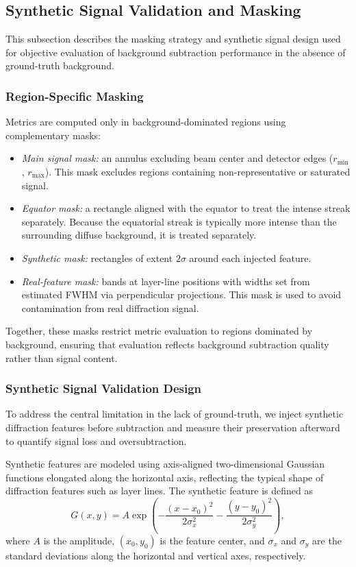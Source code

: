 \documentclass[iucr]{iucrjournals}
\begin{document}
\subsection{Synthetic Signal Validation and Masking}

This subsection describes the masking strategy and synthetic signal design used for objective evaluation of background subtraction performance in the absence of ground-truth background.

\subsubsection{Region-Specific Masking}

Metrics are computed only in background-dominated regions using complementary masks:
\begin{itemize}
\item \textit{Main signal mask:} an annulus excluding beam center and detector edges ($r_{\mathrm{min}}$, $r_{\mathrm{max}}$). This mask excludes regions containing non-representative or saturated signal.
\item \textit{Equator mask:} a rectangle aligned with the equator to treat the intense streak separately. Because the equatorial streak is typically more intense than the surrounding diffuse background, it is treated separately.
\item \textit{Synthetic mask:} rectangles of extent $2\sigma$ around each injected feature.
\item \textit{Real-feature mask:} bands at layer-line positions with widths set from estimated FWHM via perpendicular projections. This mask is used to avoid contamination from real diffraction signal.
\end{itemize}

Together, these masks restrict metric evaluation to regions dominated by background, ensuring that evaluation reflects background subtraction quality rather than signal content.


\subsubsection{Synthetic Signal Validation Design}

To address the central limitation in the lack of ground-truth, we inject synthetic diffraction features before subtraction and measure their preservation afterward to quantify signal loss and oversubtraction.


Synthetic features are modeled using axis-aligned two-dimensional Gaussian functions elongated along the horizontal axis, reflecting the typical shape of diffraction features such as layer lines. The synthetic feature is defined as
\begin{equation}
G(x, y) = A \exp\!\left(
-\frac{(x-x_0)^2}{2\sigma_x^2}
-\frac{(y-y_0)^2}{2\sigma_y^2}
\right),
\end{equation}
where $A$ is the amplitude, $(x_0, y_0)$ is the feature center, and $\sigma_x$ and $\sigma_y$ are the standard deviations along the horizontal and vertical axes, respectively.
\end{document}
